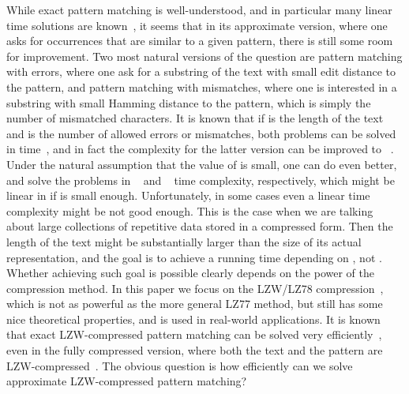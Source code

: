 \documentclass[runningheads]{llncs}
\begin{document}
While exact pattern matching is well-understood, and in particular many linear time solutions are known~\cite{Jewels}, it seems that in its approximate version, where one asks for occurrences that are similar to a given pattern, there is still some room for improvement. Two most natural versions of the question are pattern matching with errors, where one ask for a substring of the text with small edit distance to the pattern, and pattern matching with mismatches, where one is interested in a substring with small Hamming distance to the pattern, which is simply the number of mismatched characters. It is known that if  is the length of the text and  is the number of allowed errors or mismatches, both problems can be solved in  time~\cite{LandauMismatches,Landau}, and in fact the complexity for the latter version can be improved to ~\cite{AmirMismatches}. Under the natural assumption that the value of  is small, one can do even better, and solve the problems in ~\cite{ColeHariharan} and ~\cite{AmirMismatches} time complexity, respectively, which might be linear in  if  is small enough. Unfortunately, in some cases even a linear time complexity might be not good enough. This is the case when we are talking about large collections of repetitive data stored in
a compressed form. Then the length of the text  might be substantially larger than the size  of its actual representation, and the goal is to achieve a running time depending on , not . Whether achieving such goal is possible clearly depends on the power of the compression method. In this paper we focus on the LZW/LZ78 compression~\cite{LZW,LZ78}, which is not as powerful as the more general LZ77 method, but still has some nice theoretical properties, and is used in real-world applications. It is known that exact LZW-compressed pattern matching can be solved very efficiently~\cite{Amir,GawrychowskiLZW}, even in the fully compressed version, where both the text and the pattern are LZW-compressed~\cite{GawrychowskiFully}. The obvious question is how efficiently can we solve approximate LZW-compressed pattern matching?
\end{document}
